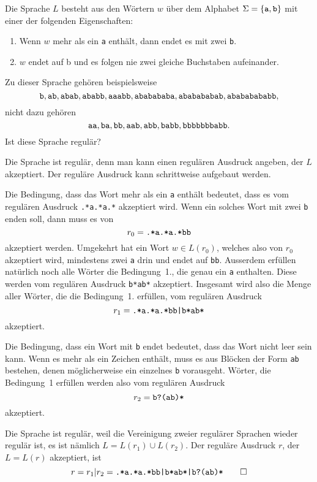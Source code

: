 Die Sprache $L$ besteht aus den Wörtern $w$ über dem Alphabet
$\Sigma=\{\text{\tt a},\text{\tt b}\}$ mit einer der folgenden Eigenschaften:
\begin{enumerate}
\item Wenn $w$ mehr als ein {\tt a} enthält, dann endet es mit zwei {\tt b}.
\item $w$ endet auf {\text b} und es folgen nie zwei gleiche
Buchstaben aufeinander.
\end{enumerate}
Zu dieser Sprache gehören beispielsweise
\[
\text{\tt b},
\text{\tt ab},
\text{\tt abab},
\text{\tt ababb},
\text{\tt aaabb},
\text{\tt ababababa},
\text{\tt ababababab},
\text{\tt abababababb},
\]
nicht dazu gehören
\[
\text{\tt aa},
\text{\tt ba},
\text{\tt bb},
\text{\tt aab},
\text{\tt abb},
\text{\tt babb},
\text{\tt bbbbbbbabb}.
\]
Ist diese Sprache regulär?


\begin{loesung}
Die Sprache ist regulär, denn man kann einen regulären Ausdruck
angeben, der $L$ akzeptiert. Der reguläre Ausdruck kann schrittweise
aufgebaut werden.

Die Bedingung, dass das Wort mehr als ein {\tt a} enthält bedeutet,
dass es vom regulären Ausdruck {\tt .*a.*a.*} akzeptiert wird. Wenn
ein solches Wort mit zwei {\tt b} enden soll, dann muss es von
\[
r_0=\text{\tt .*a.*a.*bb}
\]
akzeptiert werden.
Umgekehrt hat ein Wort $w\in L(r_0)$, welches also von $r_0$ akzeptiert
wird, mindestens zwei {\tt a} drin und endet auf {\tt bb}.
Ausserdem erfüllen natürlich noch alle Wörter
die Bedingung~1., die genau ein {\tt a} enthalten. Diese werden
vom regulären Ausdruck {\tt b*ab*} akzeptiert. Insgesamt wird also die
Menge aller Wörter, die die Bedingung~1. erfüllen, vom regulären
Ausdruck
\[
r_1=\text{\tt .*a.*a.*bb|b*ab*}
\]
akzeptiert.

Die Bedingung, dass ein Wort mit {\tt b} endet bedeutet, dass das Wort
nicht leer sein kann. Wenn es mehr als ein Zeichen enthält, muss es
aus Blöcken der Form {\tt ab} bestehen, denen möglicherweise ein
einzelnes {\tt b} vorausgeht. Wörter, die Bedingung~1 erfüllen werden
also vom regulären Ausdruck
\[
r_2=\text{\tt b?(ab)*}
\]
akzeptiert.

Die Sprache ist regulär, weil die Vereinigung zweier regulärer Sprachen
wieder regulär ist, es ist nämlich $L=L(r_1)\cup L(r_2)$. Der reguläre
Ausdruck $r$, der $L=L(r)$ akzeptiert, ist
\[
r=r_1|r_2 =
\text{\tt .*a.*a.*bb|b*ab*|b?(ab)*}
\qedhere
\]
\end{loesung}
